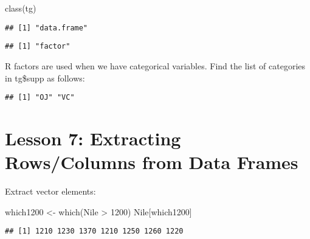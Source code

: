 \documentclass[
]{article}
\newenvironment{Shaded}{\begin{snugshade}}{\end{snugshade}}
\newcommand{\DecValTok}[1]{\textcolor[rgb]{0.00,0.00,0.81}{#1}}
\newcommand{\FunctionTok}[1]{\textcolor[rgb]{0.00,0.00,0.00}{#1}}
\newcommand{\NormalTok}[1]{#1}
\newcommand{\OtherTok}[1]{\textcolor[rgb]{0.56,0.35,0.01}{#1}}
\newcommand{\SpecialCharTok}[1]{\textcolor[rgb]{0.00,0.00,0.00}{#1}}
\begin{document}
\begin{Shaded}
\begin{Highlighting}[]
\FunctionTok{class}\NormalTok{(tg)}
\end{Highlighting}
\end{Shaded}

\begin{verbatim}
## [1] "data.frame"
\end{verbatim}

\begin{Shaded}
\end{Shaded}

\begin{verbatim}
## [1] "factor"
\end{verbatim}

R factors are used when we have categorical variables. Find the list of
categories in tg\$supp as follows:

\begin{Shaded}
\end{Shaded}

\begin{verbatim}
## [1] "OJ" "VC"
\end{verbatim}

\hypertarget{lesson-7-extracting-rowscolumns-from-data-frames}{%
\section{Lesson 7: Extracting Rows/Columns from Data
Frames}\label{lesson-7-extracting-rowscolumns-from-data-frames}}

Extract vector elements:

\begin{Shaded}
\begin{Highlighting}[]
\NormalTok{which1200 }\OtherTok{\textless{}{-}} \FunctionTok{which}\NormalTok{(Nile }\SpecialCharTok{\textgreater{}} \DecValTok{1200}\NormalTok{)}
\NormalTok{Nile[which1200]}
\end{Highlighting}
\end{Shaded}

\begin{verbatim}
## [1] 1210 1230 1370 1210 1250 1260 1220
\end{verbatim}
\end{document}
